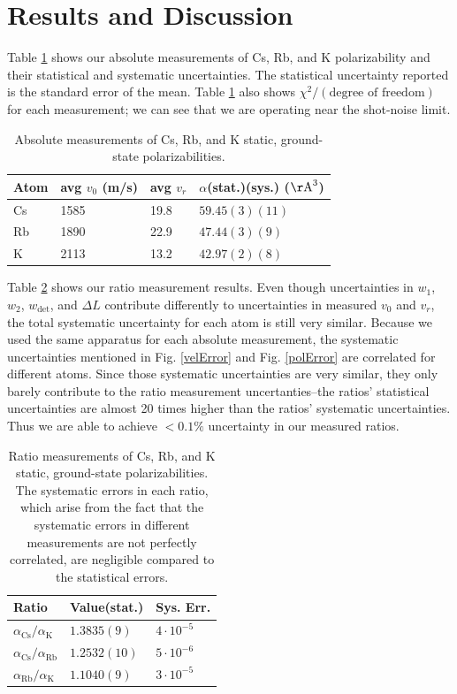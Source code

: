 \documentclass[twocolumn,prl,showpacs,superscriptaddress]{revtex4-1}   %
\newcommand{\figref}[1]{Fig. \ref{#1}}
\newcommand{\ak}{\alpha_{\textrm{K}}}
\newcommand{\arb}{\alpha_{\textrm{Rb}}}
\newcommand{\acs}{\alpha_{\textrm{Cs}}}
\newcommand{\polK}{42.97(2)(8)}
\newcommand{\polRb}{47.44(3)(9)}
\newcommand{\polCs}{59.45(3)(11)}
\newcommand{\ratRbK}{1.1040(9)}
\newcommand{\ratCsK}{1.3835(9)}
\newcommand{\ratCsRb}{1.2532(10)}
\newcommand{\AAA}{\mathrm{\AA}}
\begin{document}
\section{Results and Discussion}

Table \ref{tableAbs} shows our absolute measurements of Cs, Rb, and K polarizability and their statistical and systematic uncertainties. The statistical uncertainty reported is the standard error of the mean. Table \ref{tableAbs} also shows $\chi^2/(\text{degree of freedom})$ for each measurement; we can see that we are operating near the shot-noise limit. 

\begingroup
\begin{table}
\caption{\label{tableAbs}Absolute measurements of Cs, Rb, and K static, ground-state polarizabilities.}
\begin{center}
\begin{tabular}{l l l l}
\hline\hline
Atom & avg $v_0$ (m/s) & avg $v_r$ & $\alpha$(stat.)(sys.) ($\AAA^3$) \\
\hline
Cs & 1585 & 19.8 & $\polCs$ \\
Rb & 1890 & 22.9 & $\polRb$ \\
K  & 2113 & 13.2 & $\polK$ \\
\hline\hline
\end{tabular}
\end{center}
\end{table}
\endgroup

Table \ref{tableRatio} shows our ratio measurement results. 
Even though uncertainties in $w_1$, $w_2$, $w_{\mathrm{det}}$, and $\Delta L$ contribute differently to uncertainties in measured $v_0$ and $v_r$, the total systematic uncertainty for each atom is still very similar.
Because we used the same apparatus for each absolute measurement, the systematic uncertainties mentioned in \figref{velError} and \figref{polError} are correlated for different atoms. Since those systematic uncertainties are very similar, they only barely contribute to the ratio measurement uncertanties--the ratios' statistical uncertainties are almost 20 times higher than the ratios' systematic uncertainties.
Thus we are able to achieve $< 0.1\%$ uncertainty in our measured ratios.

\begingroup
\begin{table}
\caption{\label{tableRatio}Ratio measurements of Cs, Rb, and K static, ground-state polarizabilities. The systematic errors in each ratio, which arise from the fact that the systematic errors in different measurements are not perfectly correlated, are negligible compared to the statistical errors.}
\begin{center}
\begin{tabular}{l l l}
\hline\hline
Ratio & Value(stat.) & Sys. Err. \\
\hline
$\acs/\ak$  & $\ratCsK$ & $4\cdot 10^{-5}$  \\
$\acs/\arb$ & $\ratCsRb$ & $5\cdot 10^{-6}$ \\
$\arb/\ak$  & $\ratRbK$ & $3\cdot 10^{-5}$ \\
\hline\hline
\end{tabular}
\end{center}
\end{table}
\endgroup
\end{document}
